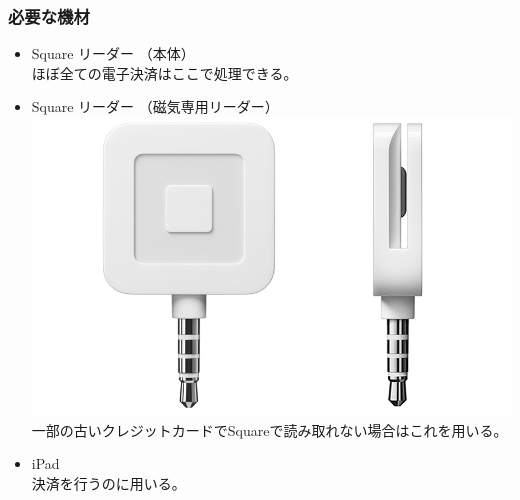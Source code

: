 \documentclass[dvipdfmx,jb5]{jarticle}
\begin{document}
 \subsubsection{必要な機材}
 \begin{itemize}
  \item Square リーダー （本体）\\
  ほぼ全ての電子決済はここで処理できる。
  \item Square リーダー （磁気専用リーダー）\\
  \includegraphics[scale=0.15]{assets/square_reader2.png}\\
  一部の古いクレジットカードでSquareで読み取れない場合はこれを用いる。
  \item iPad\\
  決済を行うのに用いる。
 \end{itemize}
\end{document}
